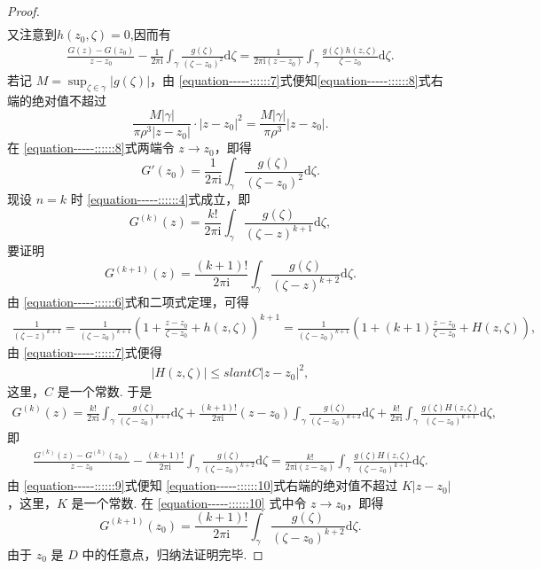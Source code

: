 \documentclass[../../main.tex]{subfiles}
\begin{document}
\begin{proof}
\begin{align*}
\end{align*}
又注意到$h(z_0,\zeta)=0$,因而有
\begin{align}
\frac{G(z) - G(z_0)}{z - z_0} - \frac{1}{2\pi \mathrm{i}} \int_{\gamma} \frac{g(\zeta)}{(\zeta - z_0)^2} \mathrm{d}\zeta  = \frac{1}{2\pi \mathrm{i} (z - z_0)} \int_{\gamma} \frac{g(\zeta)h(z, \zeta)}{\zeta - z_0} \mathrm{d}\zeta. \label{equation-----::::::8}
\end{align}
若记 \( M = \sup_{\zeta \in \gamma} |g(\zeta)| \)，由 \eqref{equation-----::::::7}式便知\eqref{equation-----::::::8}式右端的绝对值不超过
\[
\frac{M |\gamma|}{\pi \rho^3 |z - z_0|} \cdot |z - z_0|^2 = \frac{M |\gamma|}{\pi \rho^3} |z - z_0|.
\]
在 \eqref{equation-----::::::8}式两端令 \( z \to z_0 \)，即得
\[
G'(z_0) = \frac{1}{2\pi \mathrm{i}} \int_{\gamma} \frac{g(\zeta)}{(\zeta - z_0)^2} \mathrm{d}\zeta.
\]
现设 \( n = k \) 时 \eqref{equation-----::::::4}式成立，即
\[
G^{(k)}(z) = \frac{k!}{2\pi \mathrm{i}} \int_{\gamma} \frac{g(\zeta)}{(\zeta - z)^{k + 1}} \mathrm{d}\zeta,
\]
要证明
\[
G^{(k + 1)}(z) = \frac{(k + 1)!}{2\pi \mathrm{i}} \int_{\gamma} \frac{g(\zeta)}{(\zeta - z)^{k + 2}} \mathrm{d}\zeta.
\]
由 \eqref{equation-----::::::6}式和二项式定理，可得
\begin{align*}
\frac{1}{(\zeta - z)^{k + 1}} = \frac{1}{(\zeta - z_0)^{k + 1}} \left( 1 + \frac{z - z_0}{\zeta - z_0} + h(z, \zeta) \right)^{k + 1} = \frac{1}{(\zeta - z_0)^{k + 1}} \left( 1 + (k + 1) \frac{z - z_0}{\zeta - z_0} + H(z, \zeta) \right),
\end{align*}
由 \eqref{equation-----::::::7}式便得
\begin{align}
|H(z, \zeta)| \leqslant slant C |z - z_0|^2, \label{equation-----::::::9}
\end{align}
这里，\( C \) 是一个常数. 于是
\begin{align*}
G^{(k)}(z) = \frac{k!}{2\pi \mathrm{i}} \int_{\gamma} \frac{g(\zeta)}{(\zeta - z_0)^{k + 1}} \mathrm{d}\zeta + \frac{(k + 1)!}{2\pi \mathrm{i}} (z - z_0) \int_{\gamma} \frac{g(\zeta)}{(\zeta - z_0)^{k + 2}} \mathrm{d}\zeta + \frac{k!}{2\pi \mathrm{i}} \int_{\gamma} \frac{g(\zeta)H(z, \zeta)}{(\zeta - z_0)^{k + 1}} \mathrm{d}\zeta,
\end{align*}
即
\begin{align}
\frac{G^{(k)}(z) - G^{(k)}(z_0)}{z - z_0} - \frac{(k + 1)!}{2\pi \mathrm{i}} \int_{\gamma} \frac{g(\zeta)}{(\zeta - z_0)^{k + 2}} \mathrm{d}\zeta = \frac{k!}{2\pi \mathrm{i} (z - z_0)} \int_{\gamma} \frac{g(\zeta)H(z, \zeta)}{(\zeta - z_0)^{k + 1}} \mathrm{d}\zeta. \label{equation-----::::::10}
\end{align}
由 \eqref{equation-----::::::9}式便知 \eqref{equation-----::::::10}式右端的绝对值不超过 \( K |z - z_0| \)，这里，\( K \) 是一个常数. 在 \eqref{equation-----::::::10} 式中令 \( z \to z_0 \)，即得
\[
G^{(k + 1)}(z_0) = \frac{(k + 1)!}{2\pi \mathrm{i}} \int_{\gamma} \frac{g(\zeta)}{(\zeta - z_0)^{k + 2}} \mathrm{d}\zeta.
\]
由于 \( z_0 \) 是 \( D \) 中的任意点，归纳法证明完毕. 
\end{proof}
\end{document}

